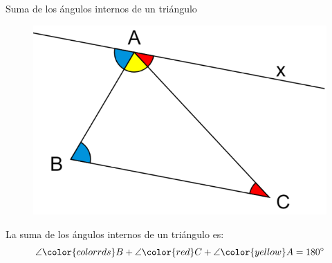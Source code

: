 \begin{infocard}{Suma de los ángulos internos de un triángulo}
    \begin{figure}[H]
        \centering
        \includegraphics[width=0.9\linewidth]{../images/angulos-internos-de-un-triangulo.png}
    \end{figure}
    La suma de los ángulos internos de un triángulo es:
    {\large\[\angle {\color{colorrds}B} + \angle {\color{red}C} + \angle {\color{yellow}A}=180^\circ\]}
\end{infocard}